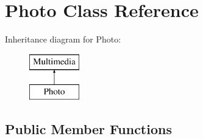 \hypertarget{class_photo}{\section{Photo Class Reference}
\label{class_photo}
}
Inheritance diagram for Photo\-:\begin{figure}[H]
\begin{center}
\leavevmode
\includegraphics[height=2.000000cm]{class_photo}
\end{center}
\end{figure}
\subsection*{Public Member Functions}

